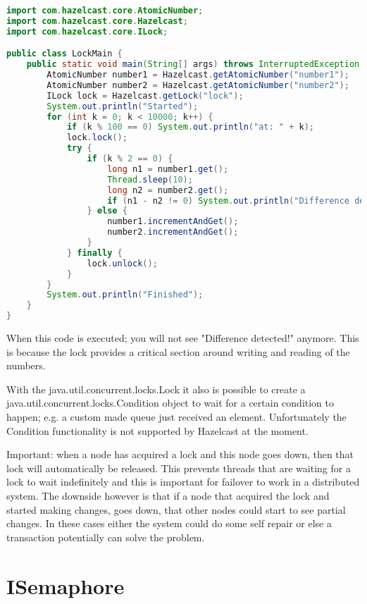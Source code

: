\begin{lstlisting}[language=java]
import com.hazelcast.core.AtomicNumber;
import com.hazelcast.core.Hazelcast;
import com.hazelcast.core.ILock;

public class LockMain {
    public static void main(String[] args) throws InterruptedException {
        AtomicNumber number1 = Hazelcast.getAtomicNumber("number1");
        AtomicNumber number2 = Hazelcast.getAtomicNumber("number2");
        ILock lock = Hazelcast.getLock("lock");
        System.out.println("Started");
        for (int k = 0; k < 10000; k++) {
            if (k % 100 == 0) System.out.println("at: " + k);
            lock.lock();
            try {
                if (k % 2 == 0) {
                    long n1 = number1.get();
                    Thread.sleep(10);
                    long n2 = number2.get();
                    if (n1 - n2 != 0) System.out.println("Difference detected!");
                } else {
                    number1.incrementAndGet();
                    number2.incrementAndGet();
                }
            } finally {
                lock.unlock();
            }
        }
        System.out.println("Finished");
    }
}
\end{lstlisting}

When this code is executed; you will not see "Difference detected!" anymore. This is because
the lock provides a critical section around writing and reading of the numbers. 

With the java.util.concurrent.locks.Lock it also is possible to create a java.util.concurrent.locks.Condition
object to wait for a certain condition to happen; e.g. a custom made queue just received an element. Unfortunately
the Condition functionality is not supported by Hazelcast at the moment.

Important: when a node has acquired a lock and this node goes down, then that lock will
automatically be released. This prevents threads that are waiting for a lock to wait 
indefinitely and this is important for failover to work in a distributed system. The downside
however is that if a node that acquired the lock and started making changes, goes down,
that other nodes could start to see partial changes. In these cases either the system
could do some self repair or else a transaction potentially can solve the problem.

\section{ISemaphore}

